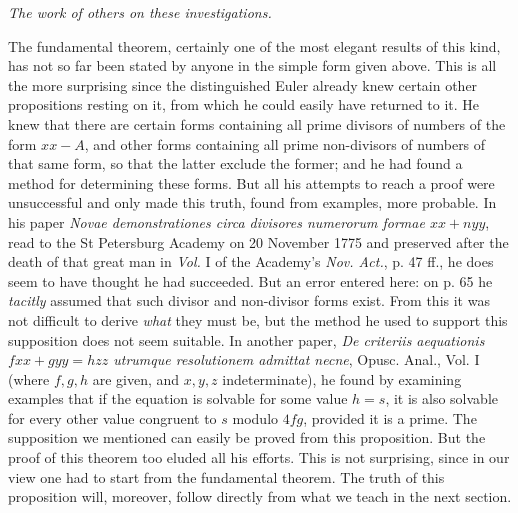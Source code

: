 \begin{center}\textit{The work of others on these investigations.}\end{center}

The fundamental theorem, certainly one of the most elegant results of this kind, has not so far been stated by anyone in the simple form given above. This is all the more surprising since the distinguished Euler already knew certain other propositions resting on it, from which he could easily have returned to it. He knew that there are certain forms containing all prime divisors of numbers of the form $xx-A$, and other forms containing all prime non-divisors of numbers of that same form, so that the latter exclude the former; and he had found a method for determining these forms. But all his attempts to reach a proof were unsuccessful and only made this truth, found from examples, more probable. In his paper \textit{Novae demonstrationes circa divisores numerorum formae $xx+nyy$}, read to the St Petersburg Academy on 20 November 1775 and preserved after the death of that great man in \textit{Vol.} I of the Academy's \textit{Nov. Act.}, p. 47 ff., he does seem to have thought he had succeeded. But an error entered here: on p. 65 he \textit{tacitly} assumed that such divisor and non-divisor forms exist. From this it was not difficult to derive \textit{what} they must be, but the method he used to support this supposition does not seem suitable. In another paper, \textit{De criteriis aequationis $fxx+gyy=hzz$ utrumque resolutionem admittat necne}, Opusc. Anal., Vol. I (where $f,g,h$ are given, and $x,y,z$ indeterminate), he found by examining examples that if the equation is solvable for some value $h=s$, it is also solvable for every other value congruent to $s$ modulo $4fg$, provided it is a prime. The supposition we mentioned can easily be proved from this proposition. But the proof of this theorem too eluded all his efforts. This is not surprising, since in our view one had to start from the fundamental theorem. The truth of this proposition will, moreover, follow directly from what we teach in the next section.

